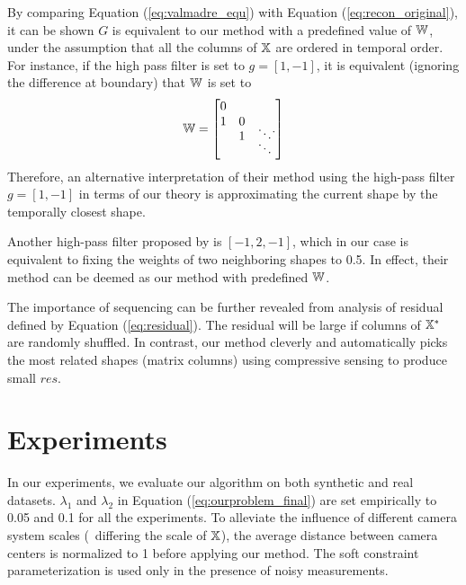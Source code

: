 By comparing Equation (\ref{eq:valmadre_equ}) with Equation (\ref{eq:recon_original}), it can be shown $G$ is equivalent to our method with a predefined value of $\mathbb W$, under the assumption that all the columns of $\mathbb X$ are ordered in temporal order. 
For instance,  if the high pass filter is set to $g=[1,-1]$, it is equivalent (ignoring the difference at boundary) that $\mathbb W$ is set to
\begin{equation}
\mathbb W = \left[
\begin{matrix}
0 &   & \\
1 & 0 & \\[-7pt]
  &	1 & \ddots \\[-7pt]
  &   & \ddots 
\end{matrix}.
\right]
\end{equation}
Therefore, an alternative interpretation of their method \cite{Valmadre_CVPR2012} using the high-pass filter $g=[1,-1]$ in terms of our theory is approximating the current shape by the temporally closest shape. 

Another high-pass filter proposed by \citet{Valmadre_CVPR2012} is $[-1, 2, -1]$, which in our case is equivalent to fixing the weights of two neighboring shapes to 0.5. %
In effect, their method can be deemed as our method with predefined $\mathbb W$. 

The importance of sequencing can be further revealed from analysis of residual defined by Equation (\ref{eq:residual}). The residual will be large if columns of $\mathbb X^*$ are randomly shuffled. In contrast, our method cleverly and automatically picks the most related shapes (matrix columns) using compressive sensing to produce small $res$.





\section{Experiments} \label{sec:experiment}
In our experiments, we evaluate our algorithm on both synthetic and real datasets. $\lambda_1$ and $\lambda_2$ in Equation (\ref{eq:ourproblem_final}) are set empirically to 0.05 and 0.1 for all the experiments. To alleviate the influence of different camera system scales (\ie~differing the scale of $\mathbb X$), the average distance between camera centers is normalized to 1 before applying our method. The soft constraint parameterization is used only in the presence of noisy measurements.

